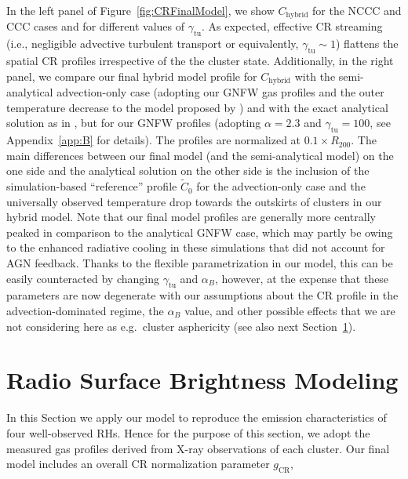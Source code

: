 \documentclass[traditabstract]{aa}
\newcommand{\rmn}{\mathrm}
\begin{document}
In the left panel of Figure~\ref{fig:CRFinalModel}, we show $C_{\rmn{hybrid}}$
for the NCCC and CCC cases and for different values of $\gamma_{\rmn{tu}}$. As
expected, effective CR streaming (i.e., negligible advective turbulent transport
or equivalently, $\gamma_{\rmn{tu}}\sim1$) flattens the spatial CR profiles
irrespective of the the cluster state. Additionally, in the right panel, we
compare our final hybrid model profile for $C_{\rmn{hybrid}}$ with the
semi-analytical advection-only case (adopting our GNFW gas profiles and the
outer temperature decrease to the model proposed by \citep{2010MNRAS.409..449P})
and with the exact analytical solution as in \citet{2011A&A...527A..99E}, but
for our GNFW profiles (adopting $\alpha=2.3$ and $\gamma_{\rmn{tu}}=100$, see
Appendix~\ref{app:B} for details).  The profiles are normalized at $0.1 \times
R_{200}$. The main differences between our final model (and the semi-analytical
model) on the one side and the analytical solution on the other side is the
inclusion of the simulation-based ``reference'' profile $\tilde{C}_0$ for the
advection-only case and the universally observed temperature drop towards the
outskirts of clusters in our hybrid model. Note that our final model profiles
are generally more centrally peaked in comparison to the analytical GNFW case,
which may partly be owing to the enhanced radiative cooling in these simulations
\cite{2010MNRAS.409..449P} that did not account for AGN feedback. Thanks to the
flexible parametrization in our model, this can be easily counteracted by
changing $\gamma_{\rmn{tu}}$ and $\alpha_B$, however, at the expense that these
parameters are now degenerate with our assumptions about the CR profile in the
advection-dominated regime, the $\alpha_B$ value, and other possible effects
that we are not considering here as e.g.~cluster asphericity (see also next
Section~\ref{sec:3}).


\section{Radio Surface Brightness Modeling}
\label{sec:3}

In this Section we apply our model to reproduce the emission characteristics of
four well-observed RHs. Hence for the purpose of this section, we adopt the
measured gas profiles derived from X-ray observations of each cluster.  Our
final model includes an overall CR normalization parameter $g_{\rmn{CR}}$,
\end{document}
